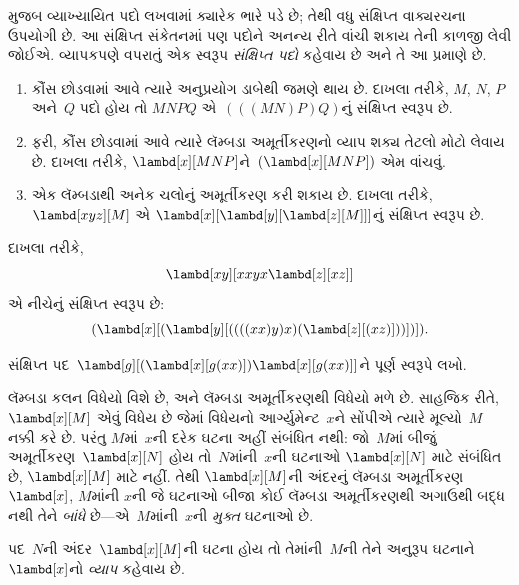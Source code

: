  મુજબ વ્યાખ્યાયિત પદો લખવામાં ક્યારેક
ભારે પડે છે; તેથી વધુ સંક્ષિપ્ત વાક્યરચના ઉપયોગી છે. આ
સંક્ષિપ્ત સંકેતનમાં પણ પદોને અનન્ય રીતે વાંચી શકાય તેની
કાળજી લેવી જોઈએ. વ્યાપકપણે વપરાતું એક સ્વરૂપ
\emph{સંક્ષિપ્ત પદો} કહેવાય છે અને તે આ પ્રમાણે છે.

\begin{enumerate}
\item કૌંસ છોડવામાં આવે ત્યારે અનુપ્રયોગ ડાબેથી જમણે થાય છે.
  દાખલા તરીકે, $M$, $N$, $P$ અને~$Q$ પદો હોય તો
  $MNPQ$ એ~$(((MN)P)Q)$નું સંક્ષિપ્ત સ્વરૂપ છે.
\item ફરી, કૌંસ છોડવામાં આવે ત્યારે લૅમ્બડા અમૂર્તીકરણનો
  વ્યાપ શક્ય તેટલો મોટો લેવાય છે. દાખલા તરીકે,
  $\lambd[x][MNP]$ને~$(\lambd[x][MNP])$ એમ વાંચવું.
\item એક લૅમ્બડાથી અનેક ચલોનું અમૂર્તીકરણ કરી શકાય છે.
  દાખલા તરીકે, $\lambd[xyz][M]$ એ
  $\lambd[x][\lambd[y][\lambd[z][M]]]$નું સંક્ષિપ્ત સ્વરૂપ છે.
\end{enumerate}

દાખલા તરીકે,
\[
\lambd[xy][xxyx \lambd[z][xz]]
\]
એ નીચેનું સંક્ષિપ્ત સ્વરૂપ છે:
\[
(\lambd[x][(\lambd[y][((((xx)y)x)(\lambd[z][(xz)]))])]).
\]

\begin{prob}
સંક્ષિપ્ત પદ~$\lambd[g][(\lambd[x][g (x x)])
  \lambd[x][g (x x)]]$ને પૂર્ણ સ્વરૂપે લખો.
\end{prob}
\endgroup


\begingroup
\makeatletter{}\makeatother

\label{guunit:OLP-0360}


લૅમ્બડા કલન વિધેયો વિશે છે, અને લૅમ્બડા અમૂર્તીકરણથી વિધેયો
મળે છે. સાહજિક રીતે, $\lambd[x][M]$ એવું વિધેય છે જેમાં વિધેયનો
આર્ગ્યુમેન્ટ~$x$ને સોંપીએ ત્યારે મૂલ્યો~$M$ નક્કી કરે છે. પરંતુ
$M$માં~$x$ની દરેક ઘટના અહીં સંબંધિત નથી: જો~$M$માં બીજું
અમૂર્તીકરણ~$\lambd[x][N]$ હોય તો~$N$માંની~$x$ની ઘટનાઓ
$\lambd[x][N]$ માટે સંબંધિત છે, $\lambd[x][M]$ માટે નહીં. તેથી
$\lambd[x][M]$ની અંદરનું લૅમ્બડા અમૂર્તીકરણ~$\lambd[x]$, $M$માંની
$x$ની જે ઘટનાઓ બીજા કોઈ લૅમ્બડા અમૂર્તીકરણથી અગાઉથી બદ્ધ નથી
તેને \emph{બાંધે} છે---એ~$M$માંની~$x$ની \emph{મુક્ત} ઘટનાઓ છે.

\begin{defn}[વ્યાપ]
પદ~$N$ની અંદર~$\lambd[x][M]$ની ઘટના હોય તો તેમાંની~$M$ની
તેને અનુરૂપ ઘટનાને~$\lambd[x]$નો \emph{વ્યાપ} કહેવાય છે.
\end{defn}

